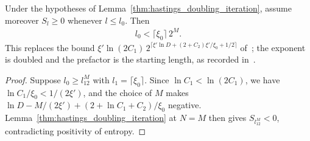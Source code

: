 \begin{lemma}
    \label{thm:hastings_doubling_window}
    \leanok
    Under the hypotheses of Lemma~\ref{thm:hastings_doubling_iteration},
    assume moreover $S_l\ge0$ whenever $l\le l_0$. Then
    \begin{align*}
        l_0<\lceil\xi_0\rceil\,2^M .
    \end{align*}
    This replaces the bound $\xi'\ln(2C_1)\,2^{\lceil\xi'\ln D
                +(2+C_2)\xi'/\xi_0+1/2\rceil}$
    of~\cite[line 229]{Hastings2007AreaLaw}; the exponent is doubled and the
    prefactor is the starting length, as recorded
    in~\cite{gap:hastings07_doubling_constants}.
\end{lemma}
\begin{proof}\leanok
    Suppose $l_0\ge l_12^M$ with $l_1=\lceil\xi_0\rceil$. Since
    $\ln C_1<\ln(2C_1)$, we have $\ln C_1/\xi_0<1/(2\xi')$, and the choice
    of $M$ makes $\ln D-M/(2\xi')+(2+\ln C_1+C_2)/\xi_0$ negative.
    Lemma~\ref{thm:hastings_doubling_iteration} at $N=M$ then gives
    $S_{l_12^M}<0$, contradicting positivity of entropy.
\end{proof}
